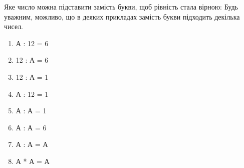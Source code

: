\problem
Яке число можна підставити замість букви, щоб рівність стала вірною:
Будь уважним, можливо, що в деяких прикладах замість букви підходить декілька чисел.
\begin{multicols}{2}
    \begin{enumerate}
        \item А : 12 = 6
        \item 12 : А = 6
        \item 12 : А = 1
        \item А : 12 = 1
        \item А : А = 1
        \item А : А = 6
        \item А : А = А
        \item А * А = А
    \end{enumerate}
\end{multicols}
